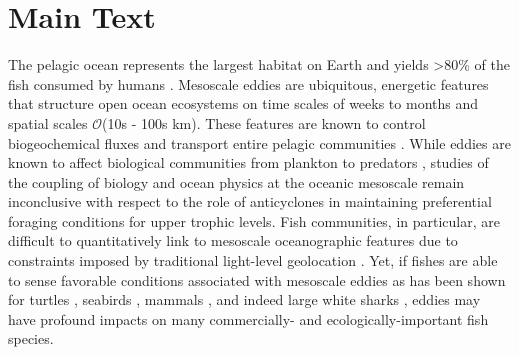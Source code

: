 \clearpage
\section{Main Text} 

The pelagic ocean represents the largest habitat on Earth \citep[99\% of the biosphere][]{Game2009} and yields >80\% of the fish consumed by humans \citep{Game2009,Pauly2002}. Mesoscale eddies are ubiquitous, energetic features that structure open ocean ecosystems \citep{McGillicuddy2016} on time scales of weeks to months and spatial scales $\mathcal{O}$(10s - 100s km). These features are known to control biogeochemical fluxes and transport entire pelagic communities \citep{Chelton2011}. While eddies are known to affect biological communities from plankton \citep{McGillicuddy2007, benitez2007mesoscale} to predators \citep{Bailleul2010,Gaube2018}, studies of the coupling of biology and ocean physics at the oceanic mesoscale remain inconclusive with respect to the role of anticyclones in maintaining preferential foraging conditions for upper trophic levels. Fish communities, in particular, are difficult to quantitatively link to mesoscale oceanographic features due to constraints imposed by traditional light-level geolocation \citep[][Chapter \ref{chap:2}]{Braun2018a}. Yet, if fishes are able to sense favorable conditions associated with mesoscale eddies as has been shown for turtles \citep{Gaube2017, Kobayashi2011}, seabirds \citep{TewKai2009}, mammals \citep{Bailleul2010}, and indeed large white sharks \citep{Gaube2018}, eddies may have profound impacts on many commercially- and ecologically-important fish species.

